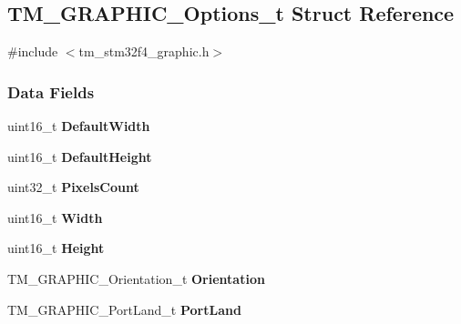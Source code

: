 \hypertarget{struct_t_m___g_r_a_p_h_i_c___options__t}{}\subsection{T\+M\+\_\+\+G\+R\+A\+P\+H\+I\+C\+\_\+\+Options\+\_\+t Struct Reference}
\label{struct_t_m___g_r_a_p_h_i_c___options__t}


{\ttfamily \#include $<$tm\+\_\+stm32f4\+\_\+graphic.\+h$>$}

\subsubsection*{Data Fields}
\begin{DoxyCompactItemize}
\item 
\hypertarget{struct_t_m___g_r_a_p_h_i_c___options__t_adca2b848d9a88c80e790be47480b1104}{}uint16\+\_\+t {\bfseries Default\+Width}\label{struct_t_m___g_r_a_p_h_i_c___options__t_adca2b848d9a88c80e790be47480b1104}

\item 
\hypertarget{struct_t_m___g_r_a_p_h_i_c___options__t_a84c881e2c85ef7c926317867e13011da}{}uint16\+\_\+t {\bfseries Default\+Height}\label{struct_t_m___g_r_a_p_h_i_c___options__t_a84c881e2c85ef7c926317867e13011da}

\item 
\hypertarget{struct_t_m___g_r_a_p_h_i_c___options__t_a448c998e60919ad5d728c7fd0074859e}{}uint32\+\_\+t {\bfseries Pixels\+Count}\label{struct_t_m___g_r_a_p_h_i_c___options__t_a448c998e60919ad5d728c7fd0074859e}

\item 
\hypertarget{struct_t_m___g_r_a_p_h_i_c___options__t_a9b3fe5d83fe7eb60cd86008934f65616}{}uint16\+\_\+t {\bfseries Width}\label{struct_t_m___g_r_a_p_h_i_c___options__t_a9b3fe5d83fe7eb60cd86008934f65616}

\item 
\hypertarget{struct_t_m___g_r_a_p_h_i_c___options__t_a1a634e0d0d740b55406a6c2c194a7bfc}{}uint16\+\_\+t {\bfseries Height}\label{struct_t_m___g_r_a_p_h_i_c___options__t_a1a634e0d0d740b55406a6c2c194a7bfc}

\item 
\hypertarget{struct_t_m___g_r_a_p_h_i_c___options__t_a1d48bdea76ea5cc67d005dcecac2ebdf}{}T\+M\+\_\+\+G\+R\+A\+P\+H\+I\+C\+\_\+\+Orientation\+\_\+t {\bfseries Orientation}\label{struct_t_m___g_r_a_p_h_i_c___options__t_a1d48bdea76ea5cc67d005dcecac2ebdf}

\item 
\hypertarget{struct_t_m___g_r_a_p_h_i_c___options__t_a7b9e3bc8393aba4b170d1c3f2c08787e}{}T\+M\+\_\+\+G\+R\+A\+P\+H\+I\+C\+\_\+\+Port\+Land\+\_\+t {\bfseries Port\+Land}\label{struct_t_m___g_r_a_p_h_i_c___options__t_a7b9e3bc8393aba4b170d1c3f2c08787e}

\end{DoxyCompactItemize}


